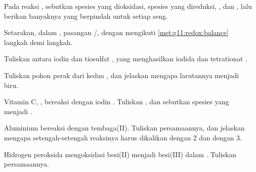 \begin{exercise}[$\star$]\label{exo:g11:redox:5}
Pada reaksi , sebutkan spesies yang
dioksidasi, spesies yang direduksi, , dan , lalu
berikan banyaknya  yang berpindah untuk setiap  seng.
\end{exercise}

\begin{exercise}[$\star\star$]\label{exo:g11:redox:6}
Setarakan, dalam ,  pasangan
/, dengan mengikuti \cref{met:g11:redox:balance}
langkah demi langkah.
\end{exercise}

\begin{exercise}[$\star\star$]\label{exo:g11:redox:7}
Tuliskan  antara iodin  dan  tiosulfat
, yang menghasilkan  iodida dan  tetrationat
.
\end{exercise}

\begin{exercise}[$\star\star$]\label{exo:g11:redox:8}
Tuliskan  pohon perak dari kedua , dan
jelaskan mengapa larutannya menjadi biru.
\end{exercise}

\begin{exercise}[$\star\star$]\label{exo:g11:redox:9}
Vitamin C, , bereaksi dengan iodin . Tuliskan
, dan sebutkan spesies yang menjadi .
\end{exercise}

\begin{exercise}[$\star\star$]\label{exo:g11:redox:10}
Aluminium bereaksi dengan  tembaga(II). Tuliskan persamaannya, dan
jelaskan mengapa setengah-setengah reaksinya harus dikalikan dengan 2
dan dengan 3.
\end{exercise}

\begin{exercise}[$\star\star$]\label{exo:g11:redox:11}
Hidrogen peroksida mengoksidasi  besi(II) menjadi  besi(III) dalam
. Tuliskan persamaannya.
\end{exercise}

